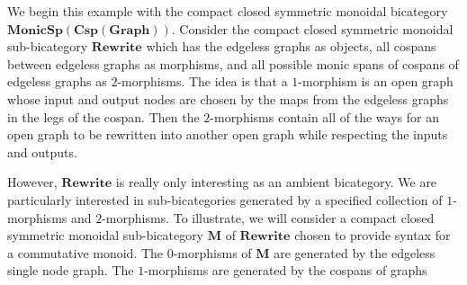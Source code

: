 \documentclass[11pt]{amsart}
\newcommand{\cat}[1]{\mathbf{#1}}
\newcommand{\bimonspcsp}[1]{\mathbf{MonicSp(Csp(#1))}}
\theoremstyle{remark}
\theoremstyle{definition}
\begin{document}
We begin this example with the compact closed symmetric monoidal bicategory $\bimonspcsp{Graph}$.  Consider the compact closed symmetric monoidal sub-bicategory $\cat{Rewrite}$ which has the edgeless graphs as objects, all cospans between edgeless graphs as morphisms, and all possible monic spans of cospans of edgeless graphs as $2$-morphisms.  The idea is that a $1$-morphism is an open graph whose input and output nodes are chosen by the maps from the edgeless graphs in the legs of the cospan. Then the $2$-morphisms contain all of the ways for an open graph to be rewritten into another open graph while respecting the inputs and outputs. 

However, $\cat{Rewrite}$ is really only interesting as an ambient bicategory.  We are particularly interested in sub-bicategories generated by a specified collection of $1$-morphisms and $2$-morphisms. To illustrate, we will consider a compact closed symmetric monoidal sub-bicategory $\cat{M}$ of $\cat{Rewrite}$ chosen to provide syntax for a commutative monoid. The $0$-morphisms of $\cat{M}$ are generated by the edgeless single node graph. The $1$-morphisms are generated by the cospans of graphs
\end{document}
